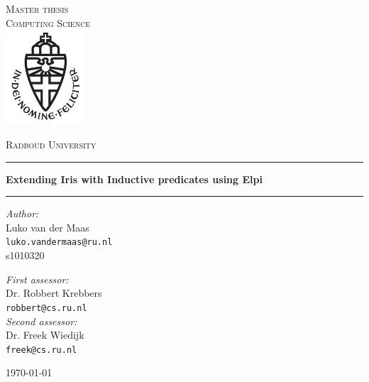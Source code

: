 \documentclass[11pt]{report}
\begin{document}
\VerbatimFootnotes

\renewcommand{\sectionautorefname}{Section}
\renewcommand{\subsectionautorefname}{Section}
\renewcommand{\chapterautorefname}{Chapter}

\begin{titlepage}
    \begin{center}
        \textsc{\LARGE Master thesis\\Computing Science}\\[1.5cm]
        \includegraphics[height=100pt]{logo}

        \vspace{0.4cm}
        \textsc{\Large Radboud University}\\[1cm]
        \hrule
        \vspace{0.4cm}
        \textbf{\huge Extending Iris with Inductive predicates using Elpi}\\[0.4cm]
        \hrule
        \vspace{2cm}
        \begin{minipage}[t]{0.45\textwidth}
            \begin{flushleft} \large
                \textit{Author:}\\
                Luko van der Maas\\
                \texttt{luko.vandermaas@ru.nl}\\
                s1010320
            \end{flushleft}
        \end{minipage}
        \begin{minipage}[t]{0.45\textwidth}
            \begin{flushright} \large
                \textit{First assessor:}\\
                Dr. Robbert Krebbers\\
                \texttt{robbert@cs.ru.nl}\\[1.3cm]
                \textit{Second assessor:}\\
                Dr. Freek Wiedijk\\
                \texttt{freek@cs.ru.nl}
            \end{flushright}
        \end{minipage}
        \vfill
        {\large \today}
    \end{center}
\end{titlepage}
\end{document}
